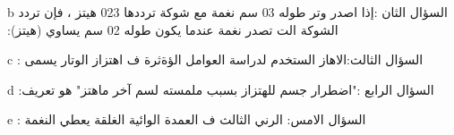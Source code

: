 \documentclass[a4paper]{article}
\begin{document}
\begin{examcopy}
\begin{multicols}{3}
  \begin{arab}\begin{question}{b}
  ‫السؤال الثان :إذا اصدر وتر طوله 03 سم نغمة مع شوكة ترددها 023 هيتز ، فإن تردد الشوكة الت تصدر نغمة عندما يكون طوله 02 سم يساوي (هيتز):
    \columnseprule=0pt\begin{multicols}{2}
    \begin{choices}[o]
    \end{choices}
    \end{multicols}
  \end{question}\end{arab}

 \begin{arab}\begin{question}{c}
       ‫السؤال الثالث:الاهاز الستخدم لدراسة العوامل الؤةثرة ف اهتزاز الوتار يسمى :‬
    \columnseprule=0pt\begin{multicols}{2}
    \begin{choices}
    \end{choices}
    \end{multicols}
  \end{question}\end{arab}

  \begin{arab}\begin{question}{d}
  ‫السؤال الرابع :"اضطرار جسم للهتزاز بسبب ملمسته لسم آخر ماهتز" هو تعريف:‬
    \begin{choices}
    \end{choices}
  \end{question}\end{arab}
  
  
  
 \begin{arab}\begin{question}{e}
 ‫السؤال الامس: الرني الثالث ف العمدة الوائية الغلقة يعطي النغمة :
    \columnseprule=0pt\begin{multicols}{2}
    \begin{choices}
    \end{choices}
    \end{multicols}
  \end{question}\end{arab}



\end{multicols}
\end{examcopy}
\end{document}

